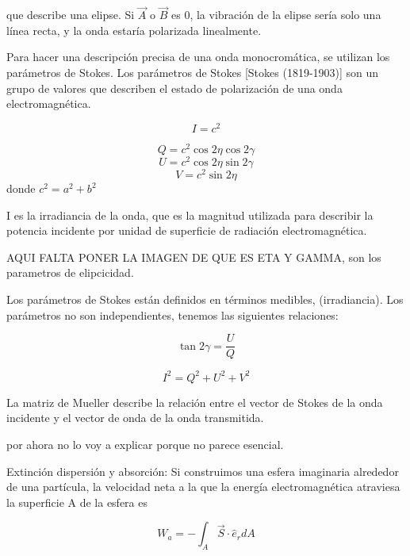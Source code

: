 \documentclass{article}
\begin{document}
que describe una elipse. Si $\vec A$ o $\vec B$ es 0, la vibración de la elipse sería solo una línea recta, y la onda estaría polarizada linealmente.

Para hacer una descripción precisa de una onda monocromática, se utilizan los parámetros de Stokes. Los parámetros de Stokes [Stokes (1819-1903)] son un grupo de valores que describen el estado de polarización de una onda electromagnética.

\begin{equation*}
    I = c^2
\end{equation*}

\begin{equation*}
    Q = c^2 \cos 2\eta \cos 2\gamma
\end{equation*}
\begin{equation*}
    U = c^2 \cos 2\eta  \sin 2\gamma
\end{equation*}
\begin{equation}
    V = c^2 \sin2\eta
\end{equation}
donde $c^2 = a^2+b^2$ 

I es la irradiancia de la onda, que es la magnitud utilizada para describir la potencia incidente por unidad de superficie de radiación electromagnética.

AQUI FALTA PONER LA IMAGEN DE QUE ES ETA Y GAMMA, son los parametros de elipcicidad.

Los parámetros de Stokes están definidos en términos medibles, (irradiancia). Los parámetros no son independientes, tenemos las siguientes relaciones:

\begin{equation}
    \tan 2\gamma = \frac{U}{Q}
\end{equation}

\begin{equation}
    I^2 = Q^2+U^2+V^2
\end{equation}

La matriz de Mueller describe la relación entre el vector de Stokes de la onda incidente y el vector de onda de la onda transmitida.

por ahora no lo voy a explicar porque no parece esencial.




Extinción dispersión y absorción:
Si construimos una esfera imaginaria alrededor de una partícula, la velocidad neta a la que la energía electromagnética atraviesa la superficie A de la esfera es

\begin{equation}
    W_a = -\int_A \vec S \cdot \hat{e}_rdA
\end{equation}
\end{document}
